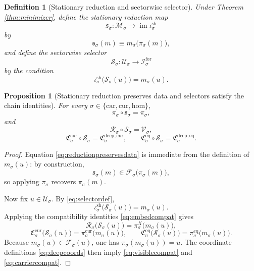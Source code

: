 \documentclass[11pt]{article}
\newcommand{\Car}{\mathrm{car}}
\newcommand{\Cur}{\mathrm{cur}}
\newcommand{\Hom}{\mathrm{hom}}
\newcommand{\ForSpace}[1]{\mathcal I_{#1}^{\mathrm{for}}}
\newcommand{\Reduction}[1]{\mathcal R_{#1}}
\newcommand{\CurrentCarrier}[1]{\mathfrak C_{#1}^{\mathrm{cur}}}
\newcommand{\EqCarrier}[1]{\mathfrak C_{#1}^{\mathrm{eq}}}
\newcommand{\SubSpace}[1]{\mathcal M_{#1}}
\newcommand{\DataProj}[1]{\pi_{#1}}
\newcommand{\SubVisible}[1]{\pi_{#1}^{X}}
\newcommand{\SubCurrent}[1]{\pi_{#1}^{\mathrm{cur}}}
\newcommand{\SubEq}[1]{\pi_{#1}^{\mathrm{eq}}}
\newcommand{\Fiber}[1]{\mathcal F_{#1}}
\newcommand{\ShellEmbed}[1]{\iota_{#1}^{\mathrm{sh}}}
\newcommand{\StationaryReduction}[1]{\mathfrak s_{#1}}
\newcommand{\DeepSpace}[1]{\mathcal U_{#1}}
\newcommand{\VisibleMap}[1]{\mathcal V_{#1}}
\newcommand{\DeepCurrentCarrier}[1]{\mathfrak C_{#1}^{\mathrm{deep,cur}}}
\newcommand{\DeepEqCarrier}[1]{\mathfrak C_{#1}^{\mathrm{deep,eq}}}
\newcommand{\ChainSelect}[1]{\mathcal S_{#1}}
\newtheorem{definition}{Definition}
\newtheorem{proposition}{Proposition}
\begin{document}
\begin{definition}[Stationary reduction and sectorwise selector]
\label{def:selector}
Under Theorem \ref{thm:minimizer}, define the stationary reduction map
\[
\StationaryReduction{\sigma}:\SubSpace{\sigma}\to\operatorname{im}\ShellEmbed{\sigma}
\]
by
\begin{equation}
\StationaryReduction{\sigma}(m)\equiv
m_{\sigma}\bigl(\DataProj{\sigma}(m)\bigr),
\label{eq:stationaryreduction}
\end{equation}
and define the sectorwise selector
\[
\ChainSelect{\sigma}:\DeepSpace{\sigma}\to\ForSpace{\sigma}
\]
by the condition
\begin{equation}
\ShellEmbed{\sigma}\bigl(\ChainSelect{\sigma}(u)\bigr)
=
m_{\sigma}(u).
\label{eq:selectordef}
\end{equation}
\end{definition}

\begin{proposition}[Stationary reduction preserves data and selectors satisfy the chain identities]
\label{prop:compat}
For every \(\sigma\in\{\Car,\Cur,\Hom\}\),
\begin{equation}
\DataProj{\sigma}\circ\StationaryReduction{\sigma}
=
\DataProj{\sigma},
\label{eq:reductionpreservesdata}
\end{equation}
and
\begin{equation}
\Reduction{\sigma}\circ\ChainSelect{\sigma}
=
\VisibleMap{\sigma},
\label{eq:visiblecompat}
\end{equation}
\begin{equation}
\CurrentCarrier{\sigma}\circ\ChainSelect{\sigma}
=
\DeepCurrentCarrier{\sigma},
\qquad
\EqCarrier{\sigma}\circ\ChainSelect{\sigma}
=
\DeepEqCarrier{\sigma}.
\label{eq:carriercompat}
\end{equation}
\end{proposition}

\begin{proof}
Equation \eqref{eq:reductionpreservesdata} is immediate from the definition of \(m_{\sigma}(u)\): by construction,
\[
\StationaryReduction{\sigma}(m)\in
\Fiber{\sigma}\bigl(\DataProj{\sigma}(m)\bigr),
\]
so applying \(\DataProj{\sigma}\) recovers \(\DataProj{\sigma}(m)\).

Now fix \(u\in\DeepSpace{\sigma}\). By \eqref{eq:selectordef},
\[
\ShellEmbed{\sigma}\bigl(\ChainSelect{\sigma}(u)\bigr)=m_{\sigma}(u).
\]
Applying the compatibility identities \eqref{eq:embedcompat} gives
\[
\Reduction{\sigma}\bigl(\ChainSelect{\sigma}(u)\bigr)
=
\SubVisible{\sigma}\bigl(m_{\sigma}(u)\bigr),
\]
\[
\CurrentCarrier{\sigma}\bigl(\ChainSelect{\sigma}(u)\bigr)
=
\SubCurrent{\sigma}\bigl(m_{\sigma}(u)\bigr),
\qquad
\EqCarrier{\sigma}\bigl(\ChainSelect{\sigma}(u)\bigr)
=
\SubEq{\sigma}\bigl(m_{\sigma}(u)\bigr).
\]
Because \(m_{\sigma}(u)\in\Fiber{\sigma}(u)\), one has \(\DataProj{\sigma}(m_{\sigma}(u))=u\). The coordinate definitions \eqref{eq:deepcoords} then imply \eqref{eq:visiblecompat} and \eqref{eq:carriercompat}.
\end{proof}
\end{document}

